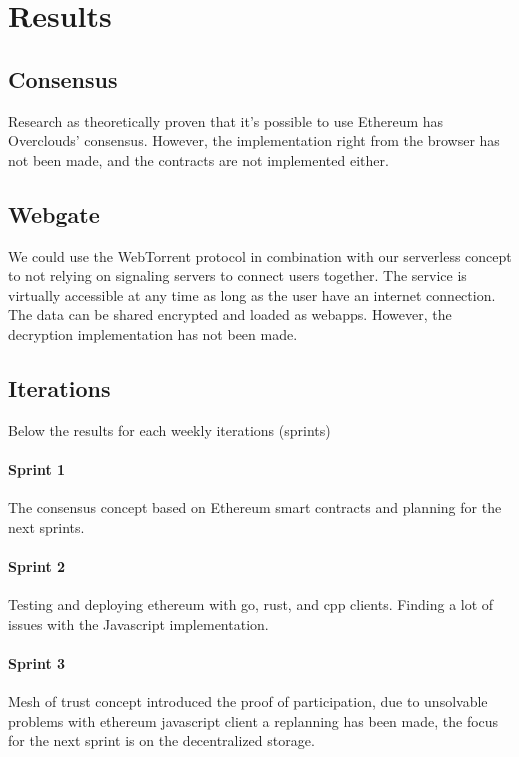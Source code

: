 
\section{Results}

\subsection{Consensus} Research as theoretically proven that it's possible to use Ethereum has Overclouds' consensus. However, the implementation right from the browser has not been made, and the contracts are not implemented either.

\subsection{Webgate} We could use the WebTorrent\cite{Torrent2015WebTorrent} protocol in combination with our serverless concept to not relying on signaling servers to connect users together. The service is virtually accessible at any time as long as the user have an internet connection. The data can be shared encrypted and loaded as webapps. However, the decryption implementation has not been made.

\subsection{Iterations} Below the results for each weekly iterations (sprints)
\paragraph{Sprint 1} The consensus concept based on Ethereum smart contracts and planning for the next sprints.
\paragraph{Sprint 2} Testing and deploying ethereum with go, rust, and cpp clients. Finding a lot of issues with the Javascript implementation.
\paragraph{Sprint 3} Mesh of trust concept introduced the proof of participation, due to unsolvable problems with ethereum javascript client a replanning has been made, the focus for the next sprint is on the decentralized storage.
